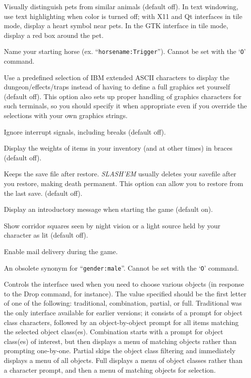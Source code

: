 \item[\ib{hilite\_pet}]
Visually distinguish pets from similar animals (default off).
In text windowing, use text highlighting when color is turned off;
with X11 and Qt interfaces in tile mode, display a heart symbol near pets.
In the GTK interface in tile mode, display a red box around the pet.

\item[\ib{horsename}]
Name your starting horse (ex. ``{\tt horsename:Trigger}'').
Cannot be set with the `{\tt O}' command.

\item[\ib{IBMgraphics}]
Use a predefined selection of IBM extended ASCII characters to display the
dungeon/effects/traps instead of having to define a full graphics set
yourself (default off).
This option also sets up proper handling of graphics
characters for such terminals, so you should specify it when appropriate
even if you override the selections with your own graphics strings.

\item[\ib{ignintr}]
Ignore interrupt signals, including breaks (default off).

\item[\ib{invweight}]
Display the weights of items in your inventory (and at other times)
in braces (default off).

\item[\ib{keep\_savefile}]
Keeps the save file after restore.  {\it SLASH'EM\/} usually deletes your savefile
after you restore,  making death permanent.  This option can allow you to
restore from the last save. (default off).

\item[\ib{legacy}]
Display an introductory message when starting the game (default on).

\item[\ib{lit\_corridor}]
Show corridor squares seen by night vision or a light source held by your
character as lit (default off).

\item[\ib{mail}]
Enable mail delivery during the game.

\item[\ib{male}]
An obsolete synonym for ``{\tt gender:male}''.  Cannot be set with the
`{\tt O}' command.

\item[\ib{menustyle}]
Controls the interface used when you need to choose various objects (in
response to the Drop command, for instance).  The value specified should
be the first letter of one of the following:  traditional, combination,
partial, or full.  Traditional was the only interface available for
earlier versions; it consists of a prompt for object class characters,
followed by an object-by-object prompt for all items matching the selected
object class(es).  Combination starts with a prompt for object class(es)
of interest, but then displays a menu of matching objects rather than
prompting one-by-one.  Partial skips the object class filtering and
immediately displays a menu of all objects.  Full displays a menu of
object classes rather than a character prompt, and then a menu of matching
objects for selection.

